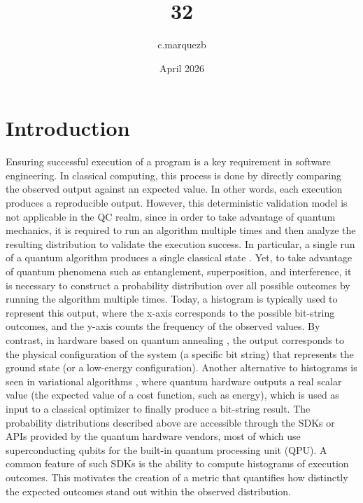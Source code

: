 \documentclass{article}
\title{32}
\author{c.marquezb }
\date{April 2026}
\begin{document}
\maketitle

\section{Introduction}

Ensuring successful execution of a program is a key requirement in software engineering. In classical computing, this process is done by directly comparing the observed output against an expected value. In other words, each execution produces a reproducible output. However, this deterministic validation model is not applicable in the QC realm, since in order to take advantage of quantum mechanics, it is required to run an algorithm multiple times and then analyze the resulting distribution to validate the execution success. In particular, a single run of a quantum algorithm produces a single classical state \cite{nielsenQuantumComputationQuantuma_2010}. Yet, to take advantage of quantum phenomena such as entanglement, superposition, and interference, it is necessary to construct a probability distribution over all possible outcomes by running the algorithm multiple times. Today, a histogram is typically used to represent this output, where the x-axis corresponds to the possible bit-string outcomes, and the y-axis counts the frequency of the observed values. By contrast, in hardware based on quantum annealing \cite{Hauke_2020_2020}, the output corresponds to the physical configuration of the system (a specific bit string) that represents the ground state (or a low-energy configuration). Another alternative to histograms is seen in variational algorithms \cite{McClean_2016_2016}, where quantum hardware outputs a real scalar value (the expected value of a cost function, such as energy), which is used as input to a classical optimizer to finally produce a bit-string result. The probability distributions described above are accessible through the SDKs or APIs provided by the quantum hardware vendors, most of which use superconducting qubits for the built-in quantum processing unit (QPU). A common feature of such SDKs is the ability to compute histograms of execution outcomes. This motivates the creation of a metric that quantifies how distinctly the expected outcomes stand out within the observed distribution.
\end{document}
